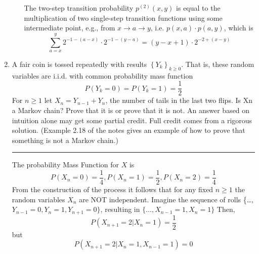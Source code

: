 \documentclass{article} %
\theoremstyle{plain}
\theoremstyle{case}
\begin{document}
\begin{enumerate}[label={\fbox{\textbf{Exercise \#\arabic* :}}}]
\begin{enumerate}
       The two-step transition probability $p^{(2)}(x, y)$ is equal to 
       the multiplication of two single-step transition functions using
       some intermediate point, e.g., from
       $x \rightarrow a \rightarrow y$, i.e.
       $p(x,a) \cdot p(a,y)$, which is
       \[ \sum^{y}_{a=x} 2^{-1-(a-x)} \cdot 2^{-1-(y-a)} = (y-x+1) \cdot 2^{-2 + (x-y)} \]
    \end{enumerate} 
\newpage
  \item A fair coin is tossed repeatedly with results $\left\{Y_k\right\}_{k \geq 0}$. That is, these random variables are i.i.d.  with common
    probability mass function
    \[ P(Y_k=0) = P(Y_k =1) = \frac{1}{2}  \]
    For $n \geq 1$ let $X_n = Y_{n-1} + Y_n$, the number of tails in the
    last two flips. Is Xn a Markov chain?
    Prove that it is or prove that it is not. An answer based on intuition
    alone may get some partial credit. Full credit comes from a rigorous
    solution. (Example 2.18 of the notes gives an example of how to prove
    that something is not a Markov chain.)
\par\noindent\rule{\textwidth}{0.1pt}
    The probability Mass Function for $X$ is 
    \[ P(X_n=0) = \frac{1}{4},  P(X_n=1) = \frac{1}{2},
          P(X_n=2)= \frac{1}{4}    \]
    From the construction of the process it follows that for any
    fixed $n \geq 1$ the random variables $X_n$ are NOT independent.
    Imagine the sequence of rolls
    \{\dots, $Y_{n-1}=0, Y_{n}=1, Y_{n+1}=0\}$, resulting in 
    $\{ \dots, X_{n-1}=1, X_{n}=1 \}$
    Then,
    \[ P(X_{n+1} = 2 | X_n = 1) = \frac{1}{2}  \]
    but
    \[ P(X_{n+1} = 2 | X_n = 1, X_{n-1} = 1) = 0  \]
    
\end{enumerate}

%
%
\end{document}
